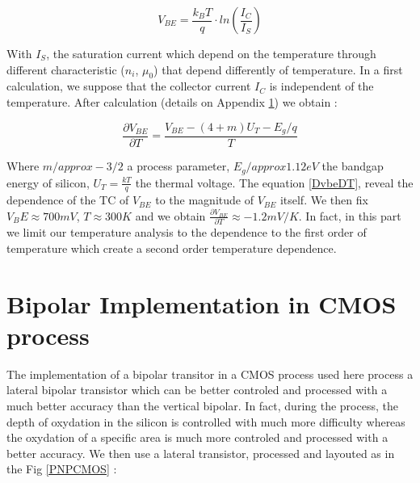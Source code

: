 \documentclass[11pt,a4paper]{report}
\begin{document}
\begin{equation}
  V_{BE} = \frac{k_BT}{q} \cdot ln \left( \frac{I_C}{I_S} \right)
\end{equation}

With $I_S$, the saturation current which depend on the temperature through different characteristic ($n_i$, $\mu_0$) that depend differently of temperature. In a first calculation, we suppose that the collector current $I_C$ is independent of the temperature. After calculation (details on Appendix \ref{}) we obtain : 

\begin{equation}
 \frac{\partial V_{BE}}{\partial T} = \frac{V_{BE} - (4+m)U_T - E_g/q}{T}
 \label{DvbeDT}                        
\end{equation}

Where $m /approx -3/2$ a process parameter, $E_g /approx 1.12 eV $ the bandgap energy of silicon, $U_T = \frac{kT}{q}$ the thermal voltage. 
The equation \ref{DvbeDT}, reveal the dependence of the TC of $V_{BE}$ to the magnitude of $V_{BE}$ itself.
We then fix $V_BE \approx 700 mV $, $T \approx 300 K$ and we obtain $\frac{\partial V_{BE}}{\partial T} \approx -1.2 mV/ K$. In fact, in this part we limit our temperature analysis to the dependence to the first order of temperature which create a second order temperature dependence.


\newpage

\section{Bipolar Implementation in CMOS process}

The implementation of a bipolar transitor in a CMOS process used here process a lateral bipolar transistor which can be better controled and processed with a much better accuracy than the vertical bipolar. In fact, during the process, the depth of oxydation in the silicon is controlled with much more difficulty whereas the oxydation of a specific area is much more controled and processed with a better accuracy. We then use a lateral transistor, processed and layouted as in the Fig \ref{PNPCMOS} : 
\end{document}
